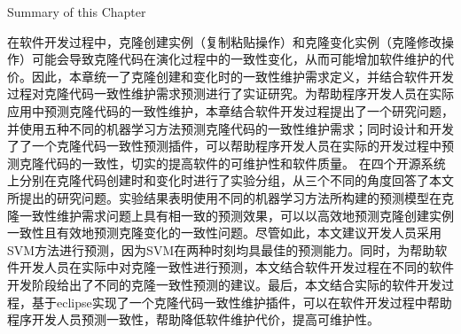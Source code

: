 



{Summary of this Chapter}

在软件开发过程中，克隆创建实例（复制粘贴操作）和克隆变化实例（克隆修改操作）可能会导致克隆代码在演化过程中的一致性变化，从而可能增加软件维护的代价。因此，本章统一了克隆创建和变化时的一致性维护需求定义，并结合软件开发过程对克隆代码一致性维护需求预测进行了实证研究。为帮助程序开发人员在实际应用中预测克隆代码的一致性维护，本章结合软件开发过程提出了一个研究问题，并使用五种不同的机器学习方法预测克隆代码的一致性维护需求；同时设计和开发了了一个克隆代码一致性预测插件，可以帮助程序开发人员在实际的开发过程中预测克隆代码的一致性，切实的提高软件的可维护性和软件质量。 %
在四个开源系统上分别在克隆代码创建时和变化时进行了实验分组，从三个不同的角度回答了本文所提出的研究问题。实验结果表明使用不同的机器学习方法所构建的预测模型在克隆一致性维护需求问题上具有相一致的预测效果，可以以高效地预测克隆创建实例一致性且有效地预测克隆变化的一致性问题。尽管如此，本文建议开发人员采用SVM方法进行预测，因为SVM在两种时刻均具最佳的预测能力。同时，为帮助软件开发人员在实际中对克隆一致性进行预测，本文结合软件开发过程在不同的软件开发阶段给出了不同的克隆一致性预测的建议。最后，本文结合实际的软件开发过程，基于eclipse实现了一个克隆代码一致性维护插件，可以在软件开发过程中帮助程序开发人员预测一致性，帮助降低软件维护代价，提高可维护性。

